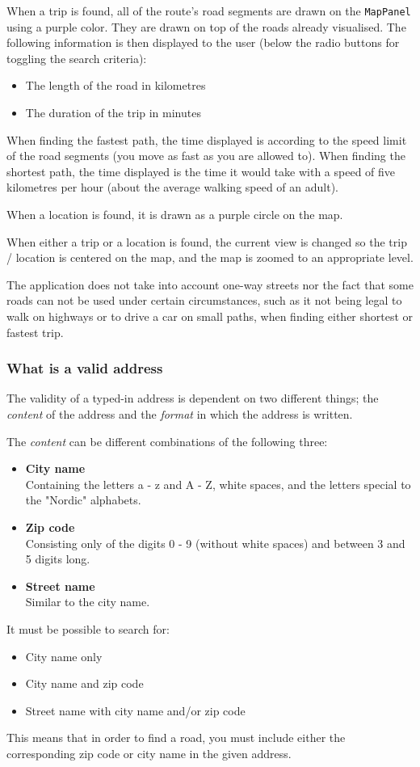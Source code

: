 When a trip is found, all of the route's road segments are drawn on the \texttt{MapPanel} using a purple color. They are drawn on top of the roads already visualised. The following information is then displayed to the user (below the radio buttons for toggling the search criteria):
\begin{itemize}
	\item The length of the road in kilometres
	\item The duration of the trip in minutes
\end{itemize}
When finding the fastest path, the time displayed is according to the speed limit of the road segments (you move as fast as you are allowed to). When finding the shortest path, the time displayed is the time it would take with a speed of five kilometres per hour (about the average walking speed of an adult).

When a location is found, it is drawn as a purple circle on the map.

When either a trip or a location is found, the current view is changed so the trip / location is centered on the map, and the map is zoomed to an appropriate level.

The application does not take into account one-way streets nor the fact that some roads can not be used under certain circumstances, such as it not being legal to walk on highways or to drive a car on small paths, when finding either shortest or fastest trip.

\subsubsection{What is a valid address}
\label{sec: What is a valid address}
\label{sec:What is a valid address}
The validity of a typed-in address is dependent on two different things; the \textit{content} of the address and the \textit{format} in which the address is written.

The \textit{content} can be different combinations of the following three:
\begin{itemize}
	\item \textbf{City name} \\
		Containing the letters a - z and A - Z, white spaces, and the letters special to the "Nordic" alphabets.
	\item \textbf{Zip code} \\
		Consisting only of the digits 0 - 9 (without white spaces) and between 3 and 5 digits long.
	\item \textbf{Street name} \\
		Similar to the city name.
\end{itemize}
It must be possible to search for:
\begin{itemize}
	\item City name only
	\item City name and zip code
	\item Street name with city name and/or zip code
\end{itemize}
This means that in order to find a road, you must include either the corresponding zip code or city name in the given address.

